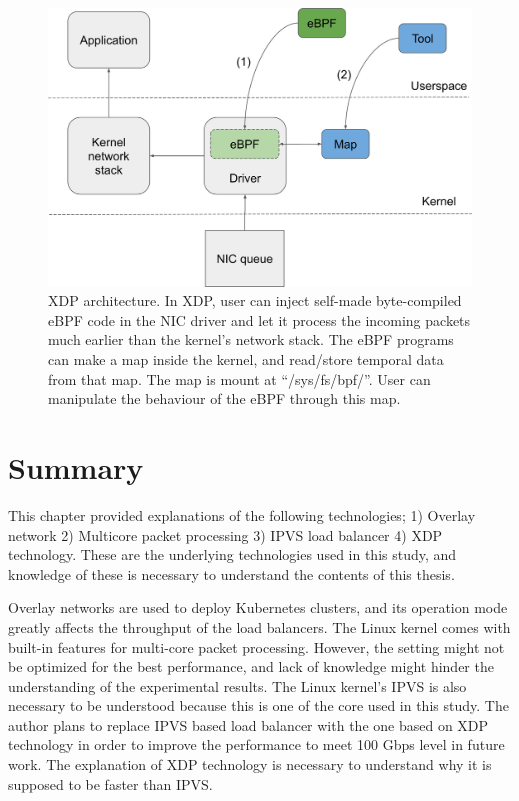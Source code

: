\begin{figure}[h]
  \centering
  \includegraphics[width=0.95\columnwidth]{Figs/xdp-schem}

  \par\bigskip
  \centering
  \begin{minipage}{0.9\columnwidth}
    \caption[XDP architecture]{
      XDP architecture.
      In XDP, user can inject self-made byte-compiled eBPF code in the NIC driver and let it process the incoming packets much earlier than the kernel's network stack.
      The eBPF programs can make a map inside the kernel, and read/store temporal data from that map.
      The map is mount at \enquote{/sys/fs/bpf/}.
      User can manipulate the behaviour of the eBPF through this map.
    }
    \label{fig:xdp-schem}
  \end{minipage}
\end{figure}

\FloatBarrier

\section{Summary}

This chapter provided explanations of the following technologies; 1) Overlay network 2) Multicore packet processing 3) IPVS load balancer 4) XDP technology.
These are the underlying technologies used in this study, and knowledge of these is necessary to understand the contents of this thesis.

Overlay networks are used to deploy Kubernetes clusters, and its operation mode greatly affects the throughput of the load balancers.
The Linux kernel comes with built-in features for multi-core packet processing.
However, the setting might not be optimized for the best performance, and lack of knowledge might hinder the understanding of the experimental results.
The Linux kernel's IPVS is also necessary to be understood because this is one of the core  used in this study.
The author plans to replace IPVS based load balancer with the one based on XDP technology in order to improve the performance to meet 100 Gbps level in future work.
The explanation of XDP technology is  necessary to understand why it is supposed to be faster than IPVS.


